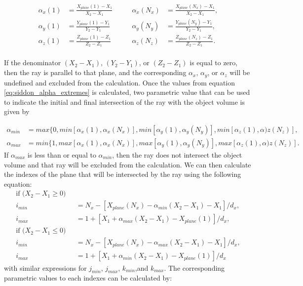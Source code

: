 \begin{equation}
\begin{aligned}
\alpha_x(1) &= \frac{X_{plane}(1) - X_1}{X_2 - X_1} \qquad &\alpha_x(N_x) &= \frac{X_{plane}(N_x) - X_1}{X_2 - X_1}, \\
\alpha_y(1) &= \frac{Y_{plane}(1) - Y_1}{Y_2 - Y_1} \qquad &\alpha_y(N_y) &= \frac{Y_{plane}(N_y) - Y_1}{Y_2 - Y_1}, \\
\alpha_z(1) &= \frac{Z_{plane}(1) - Z_1}{Z_2 - Z_1} \qquad &\alpha_z(N_z) &= \frac{Z_{plane}(N_z) - Z_1}{Z_2 - Z_1}. \\
\end{aligned}
\label{eq:siddon_alpha_extremes}
\end{equation}

If the denominator $(X_2 - X_1)$, $(Y_2-Y_1)$, or $(Z_2 - Z_1)$ is equal to zero, then the ray is parallel to that plane, and the corresponding $\alpha_x$, $\alpha_y$, or $\alpha_z$ will be undefined and excluded from the calculation.  Once the values from equation \ref{eq:siddon_alpha_extremes} is calculated, two parametric value that can be used to indicate the initial and final intersection of the ray with the object volume is given by 

\begin{equation}
\begin{aligned}
\alpha_{min} &= max\{0, min \left[ \alpha_x(1), \alpha_x(N_x) \right], min \left[ \alpha_y(1), \alpha_y(N_y) \right], min \left[ \alpha_z(1), \alpha)z (N_z) \right], \\
\alpha_{max} &= min\{1, max \left[ \alpha_x(1), \alpha_x(N_x) \right], max \left[ \alpha_y(1), \alpha_y(N_y) \right], max \left[ \alpha_z(1), \alpha)z (N_z) \right].
\end{aligned}
\label{eq:siddon_alpha_min_max}
\end{equation}
If $\alpha_{max}$ is less than or equal to $\alpha_{min}$, then the ray does not intersect the object volume and that ray will be excluded from the calculation.  We can then calculate the indexes of the plane that will be intersected by the ray using the following equation:
\begin{equation}
	\begin{aligned}
	\text{if ($X_2 - X_1 \geq 0 )$ }\\
	i_{min} &= N_x - \left[ X_{plane}(N_x) - \alpha_{min} (X_2 - X_1) - X_1 \right] /  d_x, \\
	i_{max} &= 1 + \left[ X_1 + \alpha_{max} (X_2 - X_1) - X_{plane}(1) \right] / d_x, \\
	\text{if ($X_2 - X_1 \leq 0 )$ }\\
	i_{min} &= N_x - \left[ X_{plane}(N_x) - \alpha_{max} (X_2 - X_1) - X_1 \right] /  d_x, \\
	i_{max} &= 1 + \left[ X_1 + \alpha_{min} (X_2 - X_1) - X_{plane}(1) \right] / d_x
	\end{aligned}
\label{eq:siddon_ijkminmax}
\end{equation}
with similar expressions for $j_{min}$, $j_{max}$, $k_{min}$,and $k_{max}$.  The corresponding parametric values to each indexes can be calculated by:

